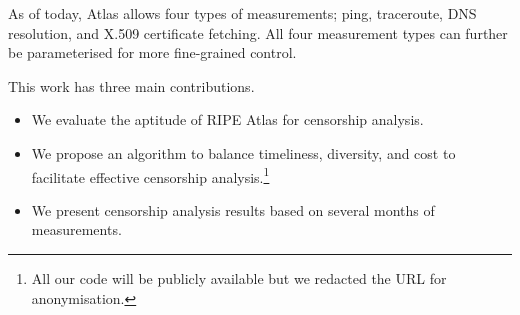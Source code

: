 As of today, Atlas allows four types of measurements; ping, traceroute, DNS resolution, and X.509
certificate fetching.  All four measurement types can further be parameterised for more fine-grained
control.

This work has three main contributions.
\begin{itemize}
	\item We evaluate the aptitude of RIPE Atlas for censorship analysis.
	\item We propose an algorithm to balance
	timeliness, diversity, and cost to facilitate effective censorship analysis.\footnote{All our
	code will be publicly available but we redacted the URL for anonymisation.}
	\item We present censorship analysis results based on several months of measurements.
\end{itemize}
